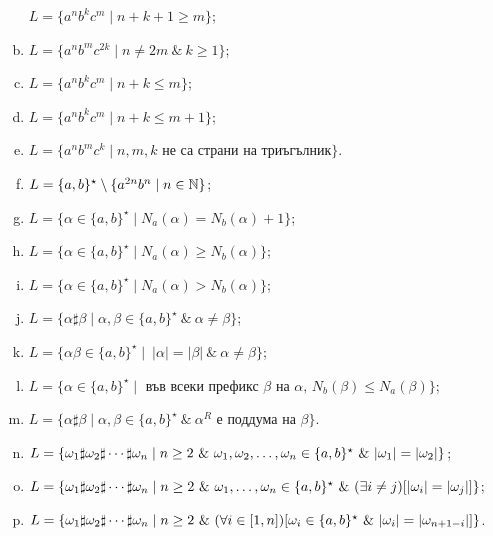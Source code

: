 \begin{problem}
\begin{enumerate}[a)]
    $L = \{a^nb^kc^m \mid n + k + 1 \geq m\}$;
  \item
    $L = \{a^nb^mc^{2k} \mid n \neq 2m\ \&\ k \geq 1\}$;
  \item
    $L = \{a^nb^kc^m \mid n + k \leq m\}$;
  \item
    $L = \{a^nb^kc^m \mid n + k \leq m+1\}$;
  \item
    $L = \{a^nb^mc^k \mid n, m, k \text{ не са страни на триъгълник}\}$.
  \item
    $L = \{a,b\}^\star \setminus \{a^{2n}b^n \mid n\in\mathbb{N}\}$;
  \item
    $L = \{\alpha \in \{a,b\}^\star\mid N_a(\alpha) = N_b(\alpha) + 1\}$;
  \item
    $L = \{\alpha \in \{a,b\}^\star\mid N_a(\alpha) \geq N_b(\alpha)\}$;
  \item
    $L = \{\alpha \in \{a,b\}^\star\mid N_a(\alpha) > N_b(\alpha)\}$;
  \item
    $L = \{\alpha\sharp\beta \mid \alpha,\beta \in \{a,b\}^\star\ \&\ \alpha \neq \beta\}$;
  \item
    $L = \{\alpha\beta \in \{a,b\}^\star \mid\ |\alpha| = |\beta|\ \&\ \alpha \neq \beta\}$;
  \item
    $L = \{\alpha \in \{a,b\}^\star \mid \text{ във всеки префикс $\beta$ на $\alpha$, } N_b(\beta) \leq N_a(\beta)\}$;
  \item
    $L = \{\alpha \sharp \beta \mid \alpha,\beta \in \{a,b\}^\star\ \&\ \alpha^R\mbox{ е поддума на }\beta \}$.
  \item
    $L = \{\omega_1 \sharp \omega_2 \sharp \cdots \sharp \omega_n \mid n\geq 2\ \&\ \omega_1,\omega_2,\dots,\omega_n \in \{a,b\}^\star\ \&\ \abs{\omega_1} = \abs{\omega_2}\}$;
  \item
    $L = \{\omega_1 \sharp \omega_2 \sharp \cdots \sharp \omega_n \mid n\geq 2\ \&\ \omega_1,\dots,\omega_n \in \{a,b\}^\star\ \&\ (\exists i \neq j)[\lvert{\omega_i}\rvert = \lvert{\omega_j}\rvert]\}$;
  \item
    $L = \{\omega_1 \sharp \omega_2 \sharp \cdots \sharp \omega_n \mid n\geq 2\ \&\ (\forall i\in[1,n])[\omega_i \in \{a,b\}^\star\ \&\ \lvert{\omega_i}\rvert = \lvert{\omega_{n+1-i}}\rvert]\}$.
  \end{enumerate}
\end{problem}
